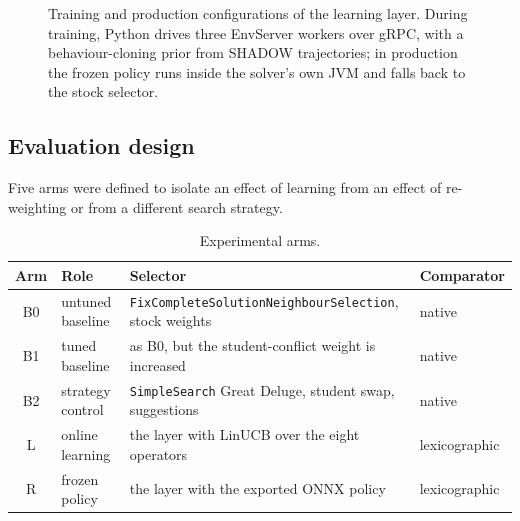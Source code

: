 \begin{figure}[H]
\caption{Training and production configurations of the learning layer. During training, Python
drives three EnvServer workers over gRPC, with a behaviour-cloning prior from SHADOW
trajectories; in production the frozen policy runs inside the solver's own JVM and falls back to
the stock selector.}
\label{fig:rl}
\end{figure}

\subsection{Evaluation design}

Five arms were defined to isolate an effect of learning from an effect of re-weighting or from a
different search strategy.

\begin{table}[H]
\centering
\caption{Experimental arms.}
\label{tab:arms}
\footnotesize
\begin{tabular}{@{}clL{7.4cm}l@{}}
\toprule
\textbf{Arm} & \textbf{Role} & \textbf{Selector} & \textbf{Comparator} \\
\midrule
B0 & untuned baseline & \texttt{FixCompleteSolutionNeighbourSelection}, stock weights & native \\
B1 & tuned baseline   & as B0, but the student-conflict weight is increased            & native \\
B2 & strategy control & \texttt{SimpleSearch} Great Deluge, student swap, suggestions  & native \\
L  & online learning  & the layer with LinUCB over the eight operators                & lexicographic \\
R  & frozen policy    & the layer with the exported ONNX policy                       & lexicographic \\
\bottomrule
\end{tabular}
\end{table}


